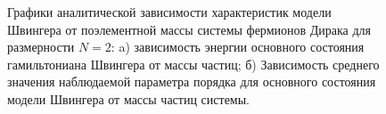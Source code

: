\documentclass[14pt]{extarticle}
\begin{document}
\begin{figure}[H]
\begin{minipage}[H]{0.46\linewidth}
\end{minipage}
\hfill
\begin{minipage}[H]{0.51\linewidth}
\end{minipage}
\caption{Графики аналитической зависимости характеристик модели Швингера от поэлементной массы системы фермионов Дирака для размерности $N = 2$: a) зависимость энергии основного состояния гамильтониана Швингера от массы частиц; б) Зависимость среднего значения наблюдаемой параметра порядка для основного состояния модели Швингера от массы частиц системы.}\label{fig:Shwinger}
\end{figure}
\end{document}
